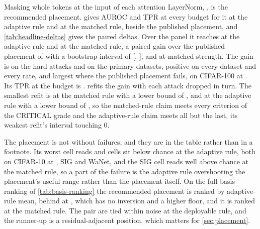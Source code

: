 \documentclass[../main.tex]{subfiles}
\begin{document}
Masking whole tokens at the input of each attention LayerNorm, \code{\RecommendedPlacement}, is the recommended placement.  gives AUROC and TPR at every budget for it at the adaptive rule and at the matched rule, beside the published placement, and \cref{tab:headline-deltas} gives the paired deltas. Over the panel it reaches \HeadlineAurocAdaptive{} at the adaptive rule and \HeadlineAurocMatched{} at the matched rule, a paired gain over the published placement of \HeadlineGainAdaptiveAuroc{} with a bootstrap interval of [\HeadlineGainAdaptiveAurocLow{}, \HeadlineGainAdaptiveAurocHigh{}], and \HeadlineGainMatchedAuroc{} at matched strength. The gain is \HardGainAdaptiveAuroc{} on the hard attacks and \PrimaryGainAdaptiveAuroc{} on the primary datasets, positive on every dataset and every rate, and largest where the published placement fails, \CifarOneZeroZeroOnePercentGain{} on CIFAR-100 at \PanelRateLow{}. Its TPR at the \LowestQuantilePercent{} budget is \HeadlineTprAtOnePercent{}.  refits the gain with each attack dropped in turn. The smallest refit is \HeadlineGainMinLeaveOneAttackOutMatched{} at the matched rule with a lower bound of \HeadlineGainMinLeaveOneAttackOutMatchedLow{}, and \HeadlineGainMinLeaveOneAttackOutAdaptive{} at the adaptive rule with a lower bound of \HeadlineGainMinLeaveOneAttackOutAdaptiveLow{}, so the matched-rule claim meets every criterion of the CRITICAL grade and the adaptive-rule claim meets all but the last, its weakest refit's interval touching $0$.





The placement is not without failures, and they are in the table rather than in a footnote. Its worst cell reads \HeadlineFloorAuroc{} and \HeadlineInversions{} cells sit below chance at the adaptive rule, both on CIFAR-10 at \PanelRateHigh{}, SIG and WaNet, and the SIG cell reads well above chance at the matched rule, so a part of the failure is the adaptive rule overshooting the placement's useful range rather than the placement itself. On the full basis ranking of \cref{tab:basis-ranking} the recommended placement is ranked \BasisRankRecommendedAdaptive{} by adaptive-rule mean, behind \code{\BasisBestPlacement} at \BasisBestAurocAdaptive{}, which has no inversion and a higher floor, and it is ranked \BasisRankRecommendedMatched{} at the matched rule. The pair are tied within noise at the deployable rule, and the runner-up is a residual-adjacent position, which matters for \cref{sec:placement}.
\end{document}
